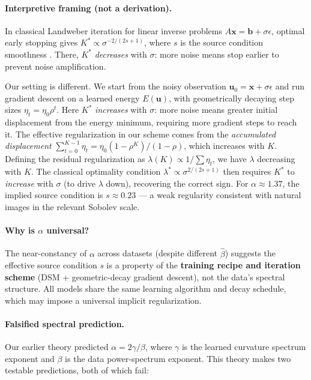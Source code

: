 \documentclass[letterpaper]{article}
\newcommand{\xx}{\mathbf{x}}
\newcommand{\uu}{\mathbf{u}}
\begin{document}
\paragraph{Interpretive framing (not a derivation).}
In classical Landweber iteration for linear inverse problems
$A\xx = \mathbf{b} + \sigma\epsilon$, optimal early stopping gives
$K^* \propto \sigma^{-2/(2s+1)}$, where $s$ is the source condition
smoothness \citep{engl1996regularization,raskutti2014early}.
There, $K^*$ \emph{decreases} with $\sigma$: more noise means
stop earlier to prevent noise amplification.

Our setting is different.
We start from the noisy observation $\uu_0 = \xx + \sigma\epsilon$
and run gradient descent on a learned energy $E(\uu)$, with
geometrically decaying step sizes $\eta_t = \eta_0 \rho^t$.
Here $K^*$ \emph{increases} with $\sigma$: more noise means
greater initial displacement from the energy minimum, requiring
more gradient steps to reach it.
The effective regularization in our scheme comes from the
\emph{accumulated displacement} $\sum_{t=0}^{K-1} \eta_t
= \eta_0(1-\rho^K)/(1-\rho)$, which increases with $K$.
Defining the residual regularization as
$\lambda(K) \propto 1/\sum\eta_t$, we have $\lambda$ decreasing
with $K$.
The classical optimality condition
$\lambda^* \propto \sigma^{2/(2s+1)}$ then requires $K^*$ to
\emph{increase} with $\sigma$ (to drive $\lambda$ down),
recovering the correct sign.
For $\alpha \approx 1.37$, the implied source condition is
$s \approx 0.23$ --- a weak regularity consistent with
natural images in the relevant Sobolev scale.

\paragraph{Why is $\alpha$ universal?}
The near-constancy of $\alpha$ across datasets (despite different
$\hat\beta$) suggests the effective source condition $s$ is
a property of the \textbf{training recipe and iteration scheme}
(DSM + geometric-decay gradient descent), not the data's spectral
structure.
All models share the same learning algorithm and decay schedule,
which may impose a universal implicit regularization.

\paragraph{Falsified spectral prediction.}
Our earlier theory predicted $\alpha = 2\gamma/\beta$, where
$\gamma$ is the learned curvature spectrum exponent and $\beta$ is
the data power-spectrum exponent.
This theory makes two testable predictions, both of which fail:
\end{document}
